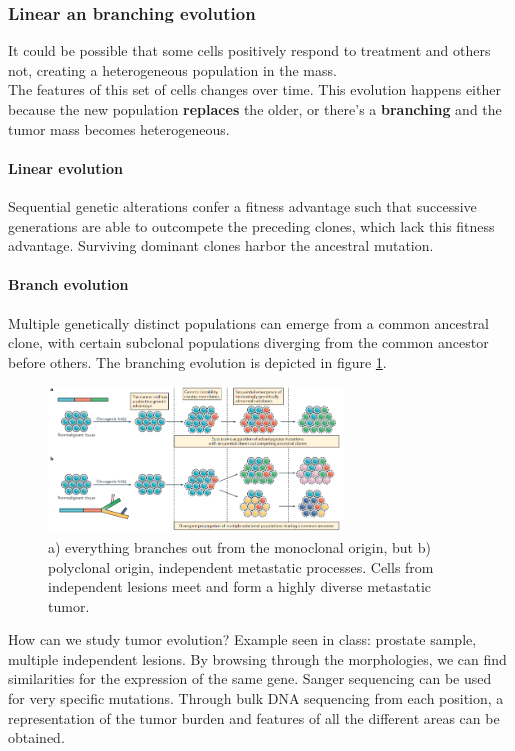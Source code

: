 \subsubsection{Linear an branching evolution}
It could be possible that some cells positively respond to treatment and others not, creating a heterogeneous population in the mass.
\\
The features of this set of cells changes over time. This evolution happens either because the new population \textbf{replaces} the older, or there's a \textbf{branching} and the tumor mass becomes heterogeneous.\\

\paragraph*{Linear evolution}
Sequential genetic alterations confer a fitness advantage such that successive generations are able to outcompete the preceding clones, which lack this fitness advantage. Surviving dominant clones harbor the ancestral mutation.

\paragraph*{Branch evolution}
Multiple genetically distinct populations can emerge from a common ancestral clone, with certain subclonal populations diverging from the common ancestor before others. The branching evolution is depicted in figure \ref{fig:branching}.

\begin{figure}[H]
	\centering
	\includegraphics[width=0.7\textwidth]{branching.png}
	\caption{ a) everything branches out from the monoclonal origin, but b) polyclonal origin, independent metastatic processes. Cells from independent lesions meet and form a highly diverse metastatic tumor.}
	\label{fig:branching}
\end{figure}

How can we study tumor evolution? Example seen in class: prostate sample, multiple independent lesions. By browsing through the morphologies, we can find similarities for the expression of the same gene. Sanger sequencing can be used for very specific mutations. Through bulk DNA sequencing from each position, a representation of the tumor burden and features of all the different areas can be obtained.

